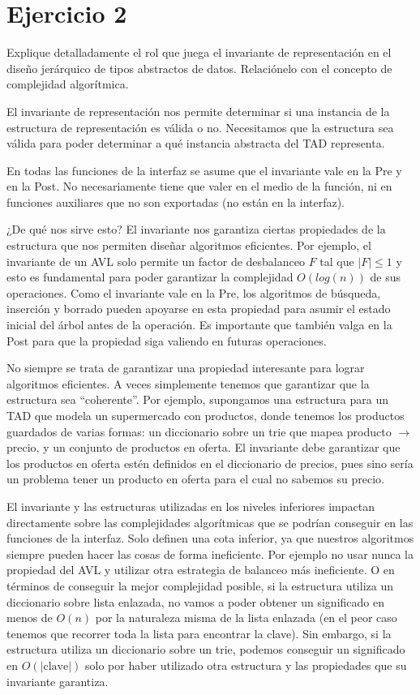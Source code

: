 \section*{Ejercicio 2}

Explique detalladamente el rol que juega el invariante de representación en el diseño jerárquico de tipos abstractos de datos. Relaciónelo con el concepto de complejidad algorítmica.

El invariante de representación nos permite determinar si una instancia de la estructura de representación es válida o no. Necesitamos que la estructura sea válida para poder determinar a qué instancia abstracta del TAD representa.

En todas las funciones de la interfaz se asume que el invariante vale en la Pre y en la Post. No necesariamente tiene que valer en el medio de la función, ni en funciones auxiliares que no son exportadas (no están en la interfaz).

¿De qué nos sirve esto? El invariante nos garantiza ciertas propiedades de la estructura que nos permiten diseñar algoritmos eficientes. Por ejemplo, el invariante de un AVL solo permite un factor de desbalanceo $F$ tal que $|F| \leq 1$ y esto es fundamental para poder garantizar la complejidad $O(log(n))$ de sus operaciones. Como el invariante vale en la Pre, los algoritmos de búsqueda, inserción y borrado pueden apoyarse en esta propiedad para asumir el estado inicial del árbol antes de la operación. Es importante que también valga en la Post para que la propiedad siga valiendo en futuras operaciones.

No siempre se trata de garantizar una propiedad interesante para lograr algoritmos eficientes. A veces simplemente tenemos que garantizar que la estructura sea ``coherente''. Por ejemplo, supongamos una estructura para un TAD que modela un supermercado con productos, donde tenemos los productos guardados de varias formas: un diccionario sobre un trie que mapea producto $\to$ precio, y un conjunto de productos en oferta. El invariante debe garantizar que los productos en oferta estén definidos en el diccionario de precios, pues sino sería un problema tener un producto en oferta para el cual no sabemos su precio.

El invariante y las estructuras utilizadas en los niveles inferiores impactan directamente sobre las complejidades algorítmicas que se podrían conseguir en las funciones de la interfaz. Solo definen una cota inferior, ya que nuestros algoritmos siempre pueden hacer las cosas de forma ineficiente. Por ejemplo no usar nunca la propiedad del AVL y utilizar otra estrategia de balanceo más ineficiente. O en términos de conseguir la mejor complejidad posible, si la estructura utiliza un diccionario sobre lista enlazada, no vamos a poder obtener un significado en menos de $O(n)$ por la naturaleza misma de la lista enlazada (en el peor caso tenemos que recorrer toda la lista para encontrar la clave). Sin embargo, si la estructura utiliza un diccionario sobre un trie, podemos conseguir un significado en $O(|\text{clave}|)$ solo por haber utilizado otra estructura y las propiedades que su invariante garantiza.
